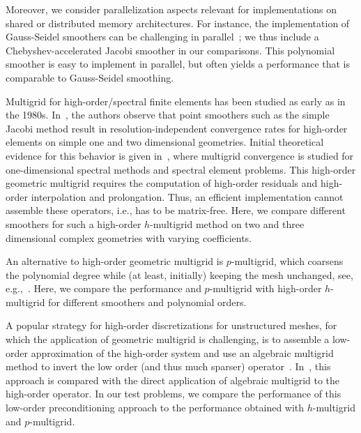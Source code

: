 \documentclass[smallcondensed,final]{svjour3}     %
\begin{document}
Moreover, we consider parallelization aspects relevant for implementations on
shared or distributed memory architectures. For instance, the implementation of
Gauss-Seidel smoothers can be challenging in
parallel~\cite{AdamsBrezinaHuEtAl03, BakerFalgoutKolevEtAl11}; we thus include
a Chebyshev-accelerated Jacobi smoother in our comparisons. This polynomial
smoother is easy to implement in parallel, but often yields a performance that
is comparable to Gauss-Seidel smoothing.


Multigrid for high-order/spectral finite elements has been studied as early as
in the 1980s. In~\cite{RonquistPatera87}, the authors observe that point
smoothers such as the simple Jacobi method result in resolution-independent
convergence rates for high-order elements on simple one and two dimensional
geometries. Initial theoretical evidence for this behavior is given
in~\cite{MadayMunoz88}, where multigrid convergence is studied for
one-dimensional spectral methods and spectral element problems. This high-order
geometric multigrid requires the computation of high-order residuals and
high-order interpolation and prolongation. Thus, an efficient implementation
cannot assemble these operators, i.e., has to be matrix-free.  Here, we compare
different smoothers for such a high-order $h$-multigrid method on two and three
dimensional complex geometries with varying coefficients.

An alternative to high-order geometric multigrid is $p$-multigrid, which
coarsens the polynomial degree while (at least, initially) keeping the mesh
unchanged, see, e.g.,~\cite{HelenbrookMavriplisAtkins03}. Here, we
compare the
performance and $p$-multigrid
with high-order $h$-multigrid for different smoothers and polynomial orders.


A popular strategy for high-order discretizations for unstructured meshes, for
which the application of geometric multigrid is challenging, is to assemble a
low-order approximation of the high-order system and use an algebraic multigrid
method to invert the low order (and thus much sparser) operator~\cite{Brown10,
Kim07, DevilleMund90, Olson07, CanutoGervasioQuarteroni10}.
In~\cite{HeysManteuffelMcCormickEtAl05}, this approach is compared with the
direct application of algebraic multigrid to the high-order operator.  In our
test problems, we compare the performance of this low-order preconditioning
approach to the performance obtained with $h$-multigrid and $p$-multigrid.
\end{document}
